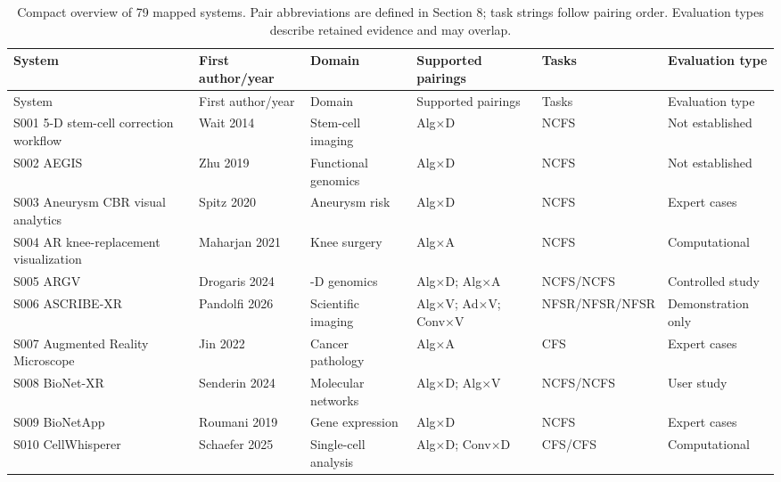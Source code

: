 \begin{landscape}\begingroup\footnotesize
\setlength{\tabcolsep}{3pt}\renewcommand{\arraystretch}{1.12}
\begin{longtable}{@{}>{\raggedright\arraybackslash}p{.23\linewidth}>{\raggedright\arraybackslash}p{.12\linewidth}>{\raggedright\arraybackslash}p{.12\linewidth}>{\raggedright\arraybackslash}p{.20\linewidth}>{\raggedright\arraybackslash}p{.09\linewidth}>{\raggedright\arraybackslash}p{.18\linewidth}@{}}
\caption{Compact overview of 79 mapped systems. Pair abbreviations are defined in Section 8; task strings follow pairing order. Evaluation types describe retained evidence and may overlap.}\label{tab:supp-system-overview}\\
\toprule System & First author/year & Domain & Supported pairings & Tasks & Evaluation type\\\midrule
\endfirsthead
\toprule System & First author/year & Domain & Supported pairings & Tasks & Evaluation type\\\midrule
\endhead
\bottomrule\endfoot
S001 5-D stem-cell correction workflow & Wait 2014 & Stem-cell imaging & Alg$\times$D & NCFS & Not established \\
S002 AEGIS & Zhu 2019 & Functional genomics & Alg$\times$D & NCFS & Not established \\
S003 Aneurysm CBR visual analytics & Spitz 2020 & Aneurysm risk & Alg$\times$D & NCFS & Expert cases \\
S004 AR knee-replacement visualization & Maharjan 2021 & Knee surgery & Alg$\times$A & NCFS & Computational \\
S005 ARGV & Drogaris 2024 & 3-D genomics & Alg$\times$D; Alg$\times$A & NCFS/\allowbreak{}NCFS & Controlled study \\
S006 ASCRIBE-XR & Pandolfi 2026 & Scientific imaging & Alg$\times$V; Ad$\times$V; Conv$\times$V & NFSR/\allowbreak{}NFSR/\allowbreak{}NFSR & Demonstration only \\
S007 Augmented Reality Microscope & Jin 2022 & Cancer pathology & Alg$\times$A & CFS & Expert cases \\
S008 BioNet-XR & Senderin 2024 & Molecular networks & Alg$\times$D; Alg$\times$V & NCFS/\allowbreak{}NCFS & User study \\
S009 BioNetApp & Roumani 2019 & Gene expression & Alg$\times$D & NCFS & Expert cases \\
S010 CellWhisperer & Schaefer 2025 & Single-cell analysis & Alg$\times$D; Conv$\times$D & CFS/\allowbreak{}CFS & Computational \\

\end{longtable}
\end{landscape}
